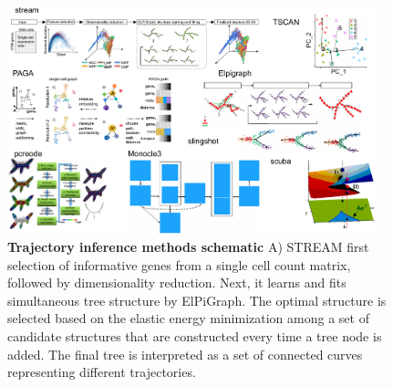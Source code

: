 \begin{figure}[hb!]
	\centering
	\includegraphics[width=0.95\textwidth]{TI_schemtaic/fig}
	\vspace{0.1cm}
	\caption[illustration of TI competing methods schematic.]{\textbf{Trajectory inference methods schematic} 
	A)  STREAM first selection of informative genes from a single cell count matrix, followed by dimensionality reduction. Next, it learns and fits simultaneous tree structure by ElPiGraph. The optimal structure is selected based on the elastic energy minimization among a set of candidate structures that are constructed every time a tree node is added. The final tree is interpreted as a set of connected curves representing different trajectories. 
	}
	\label{fig:TI_schemtaic}
\end{figure}
\addtocounter{figure}{-1}
